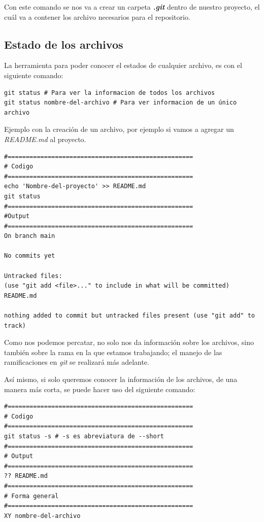 Con este comando se nos va a crear un carpeta \textit{\textbf{.git}}  dentro de nuestro proyecto, el cuál va a contener los archivo necesarios para el repositorio.

\subsection{Estado de los archivos}

La herramienta para poder conocer el estados de cualquier archivo, es con el siguiente comando:

\begin{gitCode}
\begin{verbatim}
git status # Para ver la informacion de todos los archivos
git status nombre-del-archivo # Para ver informacion de un único archivo
\end{verbatim}
\end{gitCode}

Ejemplo con la creación de un archivo, por ejemplo si vamos a agregar un \emph{README.md} al proyecto.

\begin{terminal}
\begin{verbatim}
#===================================================
# Codigo
#===================================================
echo 'Nombre-del-proyecto' >> README.md
git status
#===================================================
#Output
#===================================================
On branch main

No commits yet

Untracked files:
(use "git add <file>..." to include in what will be committed)
README.md

nothing added to commit but untracked files present (use "git add" to track)
\end{verbatim}
\end{terminal}

Como nos podemos percatar, no solo nos da información sobre los archivos, sino también sobre la rama en la que estamos trabajando; el
manejo de las ramificaciones en \emph{git} se realizará más adelante.

Así mismo, si solo queremos conocer la información de los archivos, de una manera más corta, se puede hacer uso del siguiente comando:

\begin{gitCode}
\begin{verbatim}
#===================================================
# Codigo
#===================================================
git status -s # -s es abreviatura de --short
#===================================================
# Output
#===================================================
?? README.md
#===================================================
# Forma general
#===================================================
XY nombre-del-archivo
\end{verbatim}
\end{gitCode}

